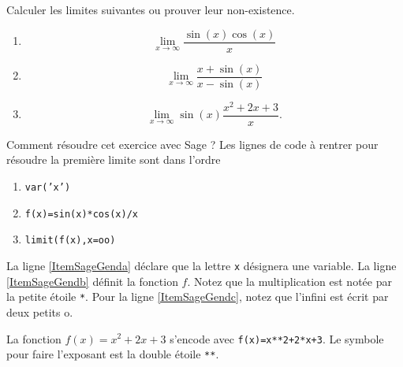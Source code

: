 

\begin{exercice}\label{exoINGE11140028}

	Calculer les limites suivantes ou prouver leur non-existence.
	\begin{enumerate}

		\item
			\begin{equation}
				\lim_{x\to\infty}\frac{ \sin(x)\cos(x) }{ x }
			\end{equation}
		\item
			\begin{equation}
				\lim_{x\to\infty}\frac{ x+\sin(x) }{ x-\sin(x) }
			\end{equation}
		\item
			\begin{equation}
				\lim_{x\to \infty} \sin(x)\frac{ x^2+2x+3 }{ x }.
			\end{equation}

	\end{enumerate}

	Comment résoudre cet exercice avec Sage ? Les lignes de code à rentrer pour résoudre la première limite sont dans l'ordre
	\begin{enumerate}

		\item	\label{ItemSageGenda}
			\texttt{var('x')}
		\item\label{ItemSageGendb}
			\texttt{f(x)=sin(x)*cos(x)/x}
		\item\label{ItemSageGendc}
			\texttt{limit(f(x),x=oo)}

	\end{enumerate}
	La ligne \ref{ItemSageGenda} déclare que la lettre \texttt{x} désignera une variable. La ligne \ref{ItemSageGendb} définit la fonction $f$. Notez que la multiplication est notée par la petite étoile \texttt{*}. Pour la ligne \ref{ItemSageGendc}, notez que l'infini est écrit par deux petits \og o\fg.

	La fonction $f(x)=x^2+2x+3$ s'encode avec \texttt{f(x)=x**2+2*x+3}. Le symbole pour faire l'exposant est la double étoile \texttt{**}.

\end{exercice}

